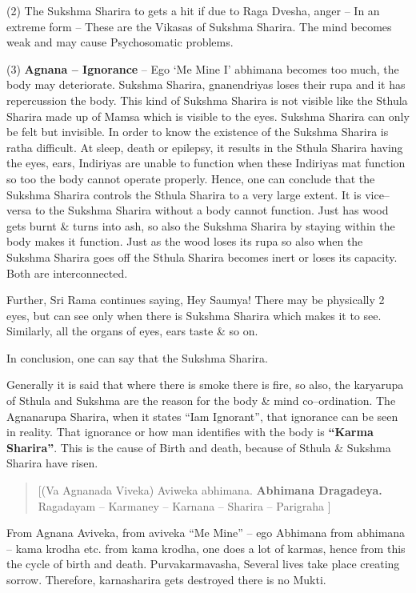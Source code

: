(2) The Sukshma Sharira to gets a hit if due to Raga Dvesha, anger – In an extreme form – These are the Vikasas of Sukshma Sharira. The mind becomes weak and may cause Psychosomatic problems.

(3) \textbf{Agnana – Ignorance} – Ego ‘Me Mine I’ abhimana becomes too much, the body may deteriorate. Sukshma Sharira, gnanendriyas loses their rupa and it has repercussion the body. This kind of Sukshma Sharira is not visible like the Sthula Sharira made up of Mamsa which is visible to the eyes. Sukshma Sharira can only be felt but invisible. In order to know the existence of the Sukshma Sharira is ratha difficult. At sleep, death or epilepsy, it results in the Sthula Sharira having the eyes, ears, Indiriyas are unable to function when these Indiriyas mat function so too the body cannot operate properly. Hence, one can conclude that the Sukshma Sharira controls the Sthula Sharira to a very large extent. It is vice–versa to the Sukshma Sharira without a body cannot function. Just has wood gets burnt \& turns into ash, so also the Sukshma Sharira by staying within the body makes it function. Just as the wood loses its rupa so also when the Sukshma Sharira goes off the Sthula Sharira becomes inert or loses its capacity. Both are interconnected.

Further, Sri Rama continues saying, Hey Saumya! There may be physically 2 eyes, but can see only when there is Sukshma Sharira which makes it to see. Similarly, all the organs of eyes, ears taste \& so on.

In conclusion, one can say that the Sukshma Sharira.

Generally it is said that where there is smoke there is fire, so also, the karyarupa of Sthula and Sukshma are the reason for the body \& mind co–ordination. The Agnanarupa Sharira, when it states “Iam Ignorant”, that ignorance can be seen in reality. That ignorance or how man identifies with the body is \textbf{“Karma Sharira”}. This is the cause of Birth and death, because of Sthula \& Sukshma Sharira have risen.

\begin{verse}
[(Va Agnanada Viveka) Aviweka abhimana. \textbf{Abhimana Dragadeya.} Ragadayam – Karmaney – Karnana – Sharira – Parigraha ]
\end{verse}

From Agnana Aviveka, from aviveka “Me Mine” – ego Abhimana from abhimana – kama krodha etc. from kama krodha, one does a lot of karmas, hence from this the cycle of birth and death. Purvakarmavasha, Several lives take place creating sorrow. Therefore, karnasharira gets destroyed there is no Mukti.

